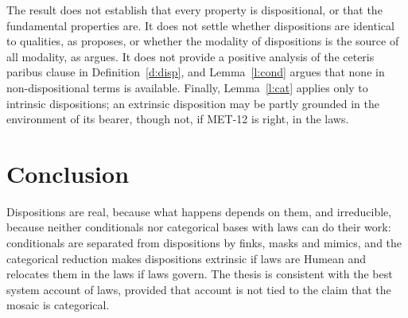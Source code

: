 \documentclass{situationist-preprint}
\begin{document}
The result does not establish that every property is dispositional, or that the fundamental properties are. It does not settle whether dispositions are identical to qualities, as \citet{Heil2003} proposes, or whether the modality of dispositions is the source of all modality, as \citet{Vetter2015} argues. It does not provide a positive analysis of the ceteris paribus clause in Definition~\ref{d:disp}, and Lemma~\ref{l:cond} argues that none in non-dispositional terms is available. Finally, Lemma~\ref{l:cat} applies only to intrinsic dispositions; an extrinsic disposition may be partly grounded in the environment of its bearer, though not, if MET-12 is right, in the laws.

\section{Conclusion}

Dispositions are real, because what happens depends on them, and irreducible, because neither conditionals nor categorical bases with laws can do their work: conditionals are separated from dispositions by finks, masks and mimics, and the categorical reduction makes dispositions extrinsic if laws are Humean and relocates them in the laws if laws govern. The thesis is consistent with the best system account of laws, provided that account is not tied to the claim that the mosaic is categorical.
\end{document}
